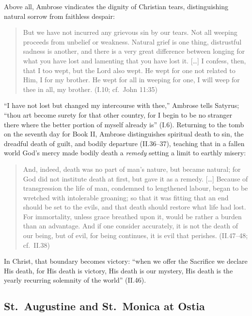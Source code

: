 Above all, Ambrose vindicates the dignity of Christian tears, distinguishing natural sorrow from faithless despair:

\begin{quote}
But we have not incurred any grievous sin by our tears. Not all weeping proceeds from unbelief or weakness. Natural grief is one thing, distrustful sadness is another, and there is a very great difference between longing for what you have lost and lamenting that you have lost it. [\ldots] I confess, then, that I too wept, but the Lord also wept. He wept for one not related to Him, I for my brother. He wept for all in weeping for one, I will weep for thee in all, my brother. (I.10; cf.\ John 11:35)
\end{quote}

``I have not lost but changed my intercourse with thee,'' Ambrose tells Satyrus; ``thou art become surety for that other country, for I begin to be no stranger there where the better portion of myself already is'' (I.6). Returning to the tomb on the seventh day for Book II, Ambrose distinguishes spiritual death to sin, the dreadful death of guilt, and bodily departure (II.36--37), teaching that in a fallen world God's mercy made bodily death a \emph{remedy} setting a limit to earthly misery:

\begin{quote}
And, indeed, death was no part of man's nature, but became natural; for God did not institute death at first, but gave it as a remedy. [\ldots] Because of transgression the life of man, condemned to lengthened labour, began to be wretched with intolerable groaning; so that it was fitting that an end should be set to the evils, and that death should restore what life had lost. For immortality, unless grace breathed upon it, would be rather a burden than an advantage. And if one consider accurately, it is not the death of our being, but of evil, for being continues, it is evil that perishes. (II.47--48; cf.\ II.38)
\end{quote}

In Christ, that boundary becomes victory: ``when we offer the Sacrifice we declare His death, for His death is victory, His death is our mystery, His death is the yearly recurring solemnity of the world'' (II.46).

\subsection{St.~Augustine and St.~Monica at Ostia}

